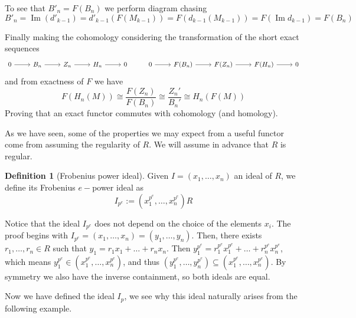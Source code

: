\documentclass[leqno]{article}
\theoremstyle{definition}
\newtheorem{definition}{Definition}[section]
\DeclareMathOperator{\im}{Im}
\begin{document}
To see that $B'_n = F(B_n)$ we perform diagram chasing
 \[
   B'_n = \im (d'_{k-1}) = d'_{k-1}(F(M_{k-1})) = F(d_{k-1}(M_{k-1})) = F(\im d_{k-1}) = F(B_n)
\] 

Finally making the cohomology considering the transformation of the short exact sequences
\[\begin{tikzcd}
	0 & {B_n} & {Z_n} & {H_n} & 0 & 0 & {F(B_n)} & {F(Z_n)} & {F(H_n)} & 0
	\arrow[from=1-1, to=1-2]
	\arrow[from=1-2, to=1-3]
	\arrow[from=1-3, to=1-4]
	\arrow[from=1-4, to=1-5]
	\arrow[from=1-6, to=1-7]
	\arrow[from=1-7, to=1-8]
	\arrow[from=1-8, to=1-9]
	\arrow[from=1-9, to=1-10]
\end{tikzcd}\]
and from exactness of $F$ we have
\[
F(H_n(M)) \cong  \frac{F(Z_n)}{F(B_n)} \cong  \frac{Z_n'}{B_n'} \cong H_n(F(M))
\] 
Proving that an exact functor commutes with cohomology (and homology).

As we have seen, some of the properties we may expect from a useful functor come from assuming the regularity of $R$. We will assume in advance that $R$ is regular.

\begin{definition}[Frobenius power ideal] Given  $I = (x_1, \ldots, x_n)$ an ideal of $R$, we define its Frobenius $e-$power ideal as
   \[
	 I _{p^e} := (x_1^{p^e}, \ldots, x_n ^{p^e})R
  \] 
\end{definition}
Notice that the ideal $I _{p^e}$ does not depend on the choice of the elements $x_i$. The proof begins with $I _{p^e} = (x_1, \ldots, x_n) = (y_1, \ldots, y_n)$. Then, there exists $r_1, \ldots, r_n \in R$ such that $y_1 = r_1x_1+\ldots+ r_nx_n$. Then $y_1 ^{p^e} = r_1 ^{p^e}x_1 ^{p^e} + \ldots+ r_n^{p^e}x_n^{p^e}$, which means $y_1 ^{p^e} \in (x_1 ^{p^e}, \ldots, x_n ^{p^e})$, and thus $(y_1 ^{p^e}, \ldots, y_n ^{p^e})\subseteq (x_1 ^{p^e}, \ldots, x_n ^{p^e})$. By symmetry we also have the inverse containment, so both ideals are equal.

Now we have defined the ideal $I _{p}$, we see why this ideal naturally arises from the following example.
\end{document}
